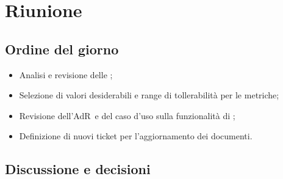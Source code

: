 \section{Riunione}
\subsection{Ordine del giorno}
\begin{itemize}
	\item Analisi e revisione delle ;
	\item Selezione di valori desiderabili e range di tollerabilità per le metriche;
	\item Revisione dell'AdR\ e del caso d'uso sulla funzionalità di ;
	\item Definizione di nuovi ticket per l'aggiornamento dei documenti.
\end{itemize}

\subsection{Discussione e decisioni}
